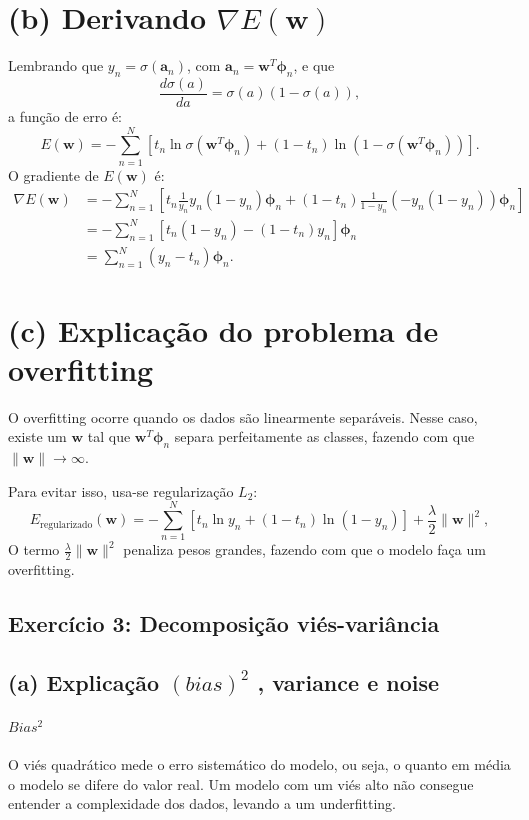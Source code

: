 \documentclass[conference]{IEEEtran}
\begin{document}
\section{(b) Derivando $\nabla E(\mathbf{w})$}
Lembrando que $y_n = \sigma(\mathbf{a}_n)$, com $\mathbf{a}_n = \mathbf{w}^T \boldsymbol{\phi}_n$, e que
\[
\frac{d\sigma(a)}{da} = \sigma(a)(1 - \sigma(a)),
\]
a função de erro é:
\[
E(\mathbf{w}) = -\sum_{n=1}^{N} \left[ t_n \ln \sigma(\mathbf{w}^T \boldsymbol{\phi}_n) + (1 - t_n) \ln(1 - \sigma(\mathbf{w}^T \boldsymbol{\phi}_n)) \right].
\]
O gradiente de $E(\mathbf{w})$ é:
\begin{align*}
\nabla E(\mathbf{w}) &= -\sum_{n=1}^{N} \left[ t_n \frac{1}{y_n} y_n (1 - y_n) \boldsymbol{\phi}_n + (1 - t_n) \frac{1}{1 - y_n} (-y_n (1 - y_n)) \boldsymbol{\phi}_n \right] \\
&= -\sum_{n=1}^{N} \left[ t_n (1 - y_n) - (1 - t_n) y_n \right] \boldsymbol{\phi}_n \\
&= \sum_{n=1}^{N} (y_n - t_n) \boldsymbol{\phi}_n.
\end{align*}

\section{(c) Explicação do problema de overfitting}
O overfitting ocorre quando os dados são linearmente separáveis. Nesse caso, existe um $\mathbf{w}$ tal que $\mathbf{w}^T \boldsymbol{\phi}_n$ separa perfeitamente as classes, fazendo com que $\|\mathbf{w}\| \to \infty$.

Para evitar isso, usa-se regularização $L_2$:
\[
E_{\text{regularizado}}(\mathbf{w}) = -\sum_{n=1}^{N} \left[ t_n \ln y_n + (1 - t_n) \ln(1 - y_n) \right] + \frac{\lambda}{2} \|\mathbf{w}\|^2,
\]
O termo $\frac{\lambda}{2} \|\mathbf{w}\|^2$ penaliza pesos grandes, fazendo com que o modelo faça um overfitting.

\subsection{Exercício 3: Decomposição viés-variância}
\label{subsec:ex3}
\subsection*{(a) Explicação $(bias) ^ 2$ , variance e noise}
\paragraph{$Bias ^ 2$}
O viés quadrático mede o erro sistemático do modelo, ou seja, o quanto em média o modelo se difere do valor real. Um modelo com um viés alto não consegue entender a complexidade dos dados, levando a um underfitting.
\end{document}
